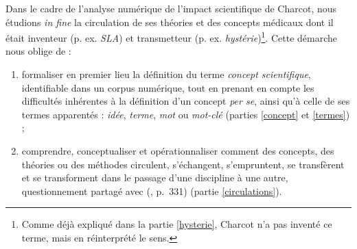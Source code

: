 Dans le cadre de l'analyse numérique de l'impact scientifique de Charcot, nous étudions \textit{in fine} la circulation de ses théories et des concepts médicaux dont il était inventeur (p. ex. \textit{SLA}) et transmetteur (p. ex. \textit{hystérie})\footnote{Comme déjà expliqué dans la partie \ref{hysterie}, Charcot n'a pas inventé ce terme, mais en réinterprété le sens.}. Cette démarche nous oblige de :
\begin{enumerate}
	\item formaliser en premier lieu la définition du terme \textit{concept scientifique}, identifiable dans un corpus numérique, tout en prenant en compte les difficultés inhérentes à la définition d'un concept \textit{per se}, ainsi qu'à celle de ses termes apparentés : \textit{idée}, \textit{terme}, \textit{mot} ou \textit{mot-clé} (parties \ref{concept} et \ref{termes}) ;
	\item comprendre, conceptualiser et opérationnaliser \og{}comment des concepts, des théories ou des méthodes circulent, s'échangent, s'empruntent, se transfèrent et se transforment dans le passage d'une discipline à une autre\fg{}, questionnement partagé avec \citeauthor{landais2014frederic} (\citeyear{landais2014frederic}, p.~331) (partie \ref{circulations}).
\end{enumerate}



